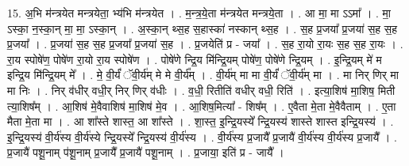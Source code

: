 \documentclass[17pt]{extarticle}
\begin{document}
15. अ॒भि म॑न्त्रयेत मन्त्रयेता॒ भ्य॑भि म॑न्त्रयेत । . म॒न्त्र॒ये॒ता म॑न्त्रयेत मन्त्रये॒ता । . आ मा॒ मा ऽऽमा᳚ । . मा॒ ऽस्का॒ न॒स्का॒न् मा॒ मा॒ ऽस्का॒न् । . अ॒स्का॒न् थ्स॒ह स॒हास्का॑ नस्कान् थ्स॒ह । . स॒ह प्र॒जया᳚ प्र॒जया॑ स॒ह स॒ह प्र॒जया᳚ । . प्र॒जया॑ स॒ह स॒ह प्र॒जया᳚ प्र॒जया॑ स॒ह । . प्र॒जयेति॑ प्र - जया᳚ । . स॒ह रा॒यो रा॒यः स॒ह स॒ह रा॒यः । . रा॒य स्पोषे॑ण॒ पोषे॑ण रा॒यो रा॒य स्पोषे॑ण । . पोषे॑णे न्द्रि॒य मि॑न्द्रि॒यम् पोषे॑ण॒ पोषे॑णे न्द्रि॒यम् । . इ॒न्द्रि॒यम् मे॑ म इन्द्रि॒य मि॑न्द्रि॒यम् मे᳚ । . मे॒ वी॒र्यं॑ ॅवी॒र्य॑म् मे मे वी॒र्य᳚म् । . वी॒र्य॑म् मा मा वी॒र्यं॑ ॅवी॒र्य॑म् मा । . मा निर् णिर् मा मा निः । . निर् व॑धीर् वधी॒र् निर् णिर् व॑धीः । . व॒धी॒ रितीति॑ वधीर् वधी॒ रिति॑ । . इत्या॒शिष॑ मा॒शिष॒ मिती त्या॒शिष᳚म् । . आ॒शिष॑ मे॒वैवाशिष॑ मा॒शिष॑ मे॒व । . आ॒शिष॒मित्या᳚ - शिष᳚म् । . ए॒वैता मे॒ता मे॒वैवैताम् । . ए॒ता मैता मे॒ता मा । . आ शा᳚स्ते शास्त॒ आ शा᳚स्ते । . शा॒स्त॒ इ॒न्द्रि॒यस्ये᳚ न्द्रि॒यस्य॑ शास्ते शास्त इन्द्रि॒यस्य॑ । . इ॒न्द्रि॒यस्य॑ वी॒र्य॑स्य वी॒र्य॑स्ये न्द्रि॒यस्ये᳚ न्द्रि॒यस्य॑ वी॒र्य॑स्य । . वी॒र्य॑स्य प्र॒जायै᳚ प्र॒जायै॑ वी॒र्य॑स्य वी॒र्य॑स्य प्र॒जायै᳚ । . प्र॒जायै॑ पशू॒नाम् प॑शू॒नाम् प्र॒जायै᳚ प्र॒जायै॑ पशू॒नाम् । . प्र॒जाया॒ इति॑ प्र - जायै᳚ । \newline
\end{document}
